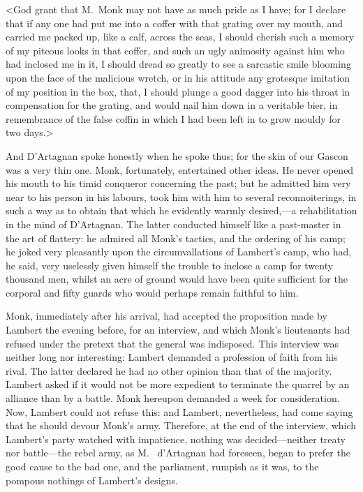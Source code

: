 <God grant that M.~Monk may not have as much pride as I have; for I declare that if any one had put me into a coffer with that grating over my mouth, and carried me packed up, like a calf, across the seas, I should cherish such a memory of my piteous looks in that coffer, and such an ugly animosity against him who had inclosed me in it, I should dread so greatly to see a sarcastic smile blooming upon the face of the malicious wretch, or in his attitude any grotesque imitation of my position in the box, that,  I should plunge a good dagger into his throat in compensation for the grating, and would nail him down in a veritable bier, in remembrance of the false coffin in which I had been left in to grow mouldy for two days.>

And D'Artagnan spoke honestly when he spoke thus; for the skin of our Gascon was a very thin one. Monk, fortunately, entertained other ideas. He never opened his mouth to his timid conqueror concerning the past; but he admitted him very near to his person in his labours, took him with him to several reconnoiterings, in such a way as to obtain that which he evidently warmly desired,—a rehabilitation in the mind of D'Artagnan. The latter conducted himself like a past-master in the art of flattery: he admired all Monk's tactics, and the ordering of his camp; he joked very pleasantly upon the circumvallations of Lambert's camp, who had, he said, very uselessly given himself the trouble to inclose a camp for twenty thousand men, whilst an acre of ground would have been quite sufficient for the corporal and fifty guards who would perhaps remain faithful to him.

Monk, immediately after his arrival, had accepted the proposition made by Lambert the evening before, for an interview, and which Monk's lieutenants had refused under the pretext that the general was indisposed. This interview was neither long nor interesting: Lambert demanded a profession of faith from his rival. The latter declared he had no other opinion than that of the majority. Lambert asked if it would not be more expedient to terminate the quarrel by an alliance than by a battle. Monk hereupon demanded a week for consideration. Now, Lambert could not refuse this: and Lambert, nevertheless, had come saying that he should devour Monk's army. Therefore, at the end of the interview, which Lambert's party watched with impatience, nothing was decided—neither treaty nor battle—the rebel army, as M.~ d'Artagnan had foreseen, began to prefer the good cause to the bad one, and the parliament, rumpish as it was, to the pompous nothings of Lambert's designs.

